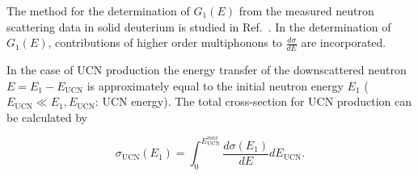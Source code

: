 The method for the determination of $G_1(E)$ from the measured neutron
scattering data in solid deuterium is studied in
Ref.~\cite{Frei2009}.  In the determination of $G_1(E)$,
contributions of higher order multiphonons to $\frac{d\sigma}{dE}$ are
incorporated.

In the case of UCN production the energy transfer of the downscattered
neutron $E=E_1-E_{\text{UCN}}$ is approximately equal to the initial
neutron energy $E_1$ ($E_{\text{UCN}} \ll E_1, E_{\text{UCN}}$: UCN
energy). The total cross-section for UCN production can be calculated
by

\begin{equation}
\sigma_{\text{UCN}}({E_1})=\int_0 ^{E_{\text{UCN}}^{max}} \frac{d\sigma (E_1)}{dE} dE_{\text{UCN}}.
\end{equation}

